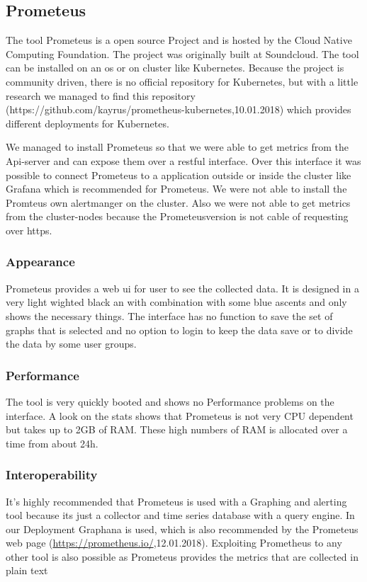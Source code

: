 \subsection{Prometeus}
\label{Prometeus} %
The tool Prometeus is a open source Project and is hosted by the Cloud Native Computing Foundation. The project was originally built at Soundcloud. The tool can be installed on an os or on cluster like Kubernetes. Because the project is community driven, there is no official repository for Kubernetes, but with a little research we managed to find this repository (https://github.com/kayrus/prometheus-kubernetes,10.01.2018) which provides different deployments for Kubernetes.

We managed to install Prometeus so that we were able to get metrics from the Api-server and can expose them over a restful interface. Over this interface it was possible to connect Prometeus to a application outside or inside the cluster like Grafana which is recommended for Prometeus. We were not able to install the Promteus own alertmanger on the cluster. Also we were not able to get metrics from the cluster-nodes because the Prometeusversion is not cable of requesting over https. 
\subsubsection{Appearance}%
Prometeus provides a web ui for user to see the collected data. It is designed in a very light wighted black an with combination with some blue ascents and only shows the necessary things. The interface has no function to save the set of graphs that is selected and no option to login to keep the data save or to divide the data by some user groups.   
\subsubsection{Performance}
The tool is very quickly booted and shows no Performance problems on the interface. A look on the stats shows that Prometeus is not very CPU dependent but takes up to 2GB of RAM. These high numbers of RAM is allocated over a time from about 24h. 
\subsubsection{Interoperability}
It's highly recommended that Prometeus is used with a Graphing and alerting tool because its just a collector and time series database with a query engine. In our Deployment Graphana is used, which is also recommended by the Prometeus web page (\url{https://prometheus.io/},12.01.2018). Exploiting Prometheus to any other tool is also possible as Prometeus provides the metrics that are collected in plain text
